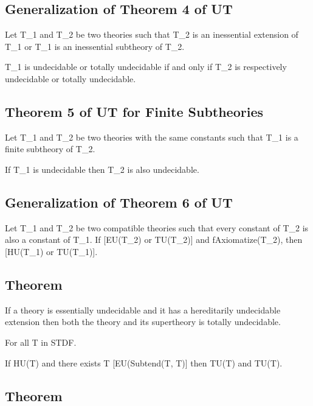 \hypertarget{generalization-of-theorem-4-of-ut}{%
\subsection{Generalization of Theorem 4 of
UT}\label{generalization-of-theorem-4-of-ut}}

Let T\_1 and T\_2 be two theories such that T\_2 is an inessential
extension of T\_1 or T\_1 is an inessential subtheory of T\_2.

T\_1 is undecidable or totally undecidable if and only if T\_2 is
respectively undecidable or totally undecidable.

\hypertarget{theorem-5-of-ut-for-finite-subtheories}{%
\subsection{Theorem 5 of UT for Finite
Subtheories}\label{theorem-5-of-ut-for-finite-subtheories}}

Let T\_1 and T\_2 be two theories with the same constants such that T\_1
is a finite subtheory of T\_2.

If T\_1 is undecidable then T\_2 is also undecidable.

\hypertarget{generalization-of-theorem-6-of-ut}{%
\subsection{Generalization of Theorem 6 of
UT}\label{generalization-of-theorem-6-of-ut}}

Let T\_1 and T\_2 be two compatible theories such that every constant of
T\_2 is also a constant of T\_1. If {[}EU(T\_2) or TU(T\_2){]} and
fAxiomatize(T\_2), then {[}HU(T\_1) or TU(T\_1){]}.

\hypertarget{theorem}{%
\subsection{Theorem}\label{theorem}}

If a theory is essentially undecidable and it has a hereditarily
undecidable extension then both the theory and its supertheory is
totally undecidable.

For all T in STDF.

If HU(T) and there exists T\textquotesingle{} {[}EU(Subtend(T,
T\textquotesingle){]} then TU(T) and TU(T\textquotesingle).

\hypertarget{theorem-1}{%
\subsection{Theorem}\label{theorem-1}}

